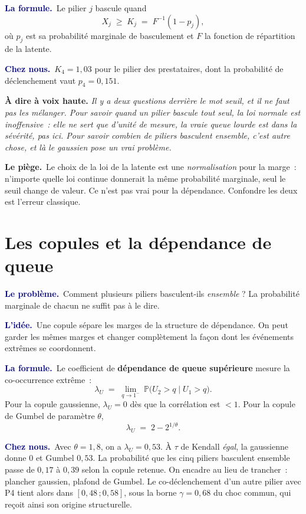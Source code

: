 \documentclass[11pt,a4paper]{article}
\newcommand{\lequoi}[1]{\smallskip\noindent\textcolor{navy}{\textbf{Le problème.}}\ #1\par}
\newcommand{\lidee}[1]{\smallskip\noindent\textcolor{navy}{\textbf{L'idée.}}\ #1\par}
\newcommand{\laformule}[1]{\smallskip\noindent\textcolor{navy}{\textbf{La formule.}}\ #1\par}
\newcommand{\cheznous}[1]{\smallskip\noindent\textcolor{navy}{\textbf{Chez nous.}}\ #1\par}
\newcommand{\lepiege}[1]{\smallskip\noindent\textcolor{accent}{\textbf{Le piège.}}\ #1\par}
\newcommand{\laphrase}[1]{\begin{phrasebox}\textbf{À dire à voix haute.} \emph{#1}\end{phrasebox}}
\begin{document}
\laformule{Le pilier $j$ bascule quand
\[
  X_j \;\ge\; K_j \;=\; F^{-1}(1-p_j),
\]
où $p_j$ est sa probabilité marginale de basculement et $F$ la fonction de répartition de la
latente.}

\cheznous{$K_4=1{,}03$ pour le pilier des prestataires, dont la probabilité de déclenchement
vaut $p_4=0{,}151$.}

\laphrase{Il y a deux questions derrière le mot seuil, et il ne faut pas les mélanger. Pour
savoir \emph{quand un pilier bascule tout seul}, la loi normale est inoffensive~: elle ne
sert que d'unité de mesure, la vraie queue lourde est dans la sévérité, pas ici. Pour savoir
\emph{combien de piliers basculent ensemble}, c'est autre chose, et là le gaussien pose un
vrai problème.}

\lepiege{Le choix de la loi de la latente est une \emph{normalisation} pour la marge~:
n'importe quelle loi continue donnerait la même probabilité marginale, seul le seuil change
de valeur. Ce n'est pas vrai pour la dépendance. Confondre les deux est l'erreur classique.}

\section{Les copules et la dépendance de queue}

\lequoi{Comment plusieurs piliers basculent-ils \emph{ensemble} ? La probabilité marginale
de chacun ne suffit pas à le dire.}

\lidee{Une copule sépare les marges de la structure de dépendance. On peut garder les mêmes
marges et changer complètement la façon dont les événements extrêmes se coordonnent.}

\laformule{Le coefficient de \textbf{dépendance de queue supérieure} mesure la
co-occurrence extrême~:
\[
  \lambda_U \;=\; \lim_{q\to1^-}\ \mathbb{P}\bigl(U_2>q \mid U_1>q\bigr).
\]
Pour la copule gaussienne, $\lambda_U = 0$ dès que la corrélation est $<1$. Pour la copule
de Gumbel de paramètre $\theta$,
\[
  \lambda_U \;=\; 2-2^{1/\theta}.
\]}

\cheznous{Avec $\theta=1{,}8$, on a $\lambda_U = 0{,}53$. À $\tau$ de Kendall \emph{égal},
la gaussienne donne $0$ et Gumbel $0{,}53$. La probabilité que les cinq piliers basculent
ensemble passe de $0{,}17$ à $0{,}39$ selon la copule retenue. On encadre au lieu de
trancher~: plancher gaussien, plafond de Gumbel. Le co-déclenchement d'un autre pilier avec P4
tient alors dans $[0{,}48\,;0{,}58]$, sous la borne $\gamma=0{,}68$ du choc commun, qui reçoit
ainsi son origine structurelle.}
\end{document}
